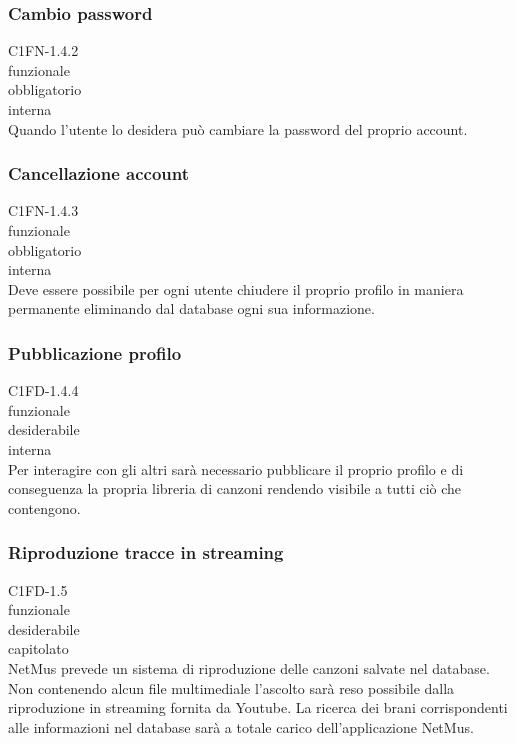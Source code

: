 \subsubsection*{Cambio password}
 C1FN-1.4.2 \\
 funzionale \\
 obbligatorio \\
 interna \\
Quando l'utente lo desidera pu\`o cambiare la password del proprio account.

\subsubsection*{Cancellazione account}
 C1FN-1.4.3 \\
 funzionale \\
 obbligatorio \\
 interna \\
Deve essere possibile per ogni utente chiudere il proprio profilo in maniera
permanente eliminando dal database ogni sua informazione.

\subsubsection*{Pubblicazione profilo}
 C1FD-1.4.4 \\
 funzionale \\
 desiderabile \\
 interna \\
Per interagire con gli altri sar\`a necessario pubblicare il proprio profilo e
di conseguenza la propria libreria di canzoni rendendo visibile a tutti ci\`o che
contengono.

\subsubsection*{Riproduzione tracce in streaming}
 C1FD-1.5 \\
 funzionale \\
 desiderabile \\
 capitolato \\
NetMus prevede un sistema di riproduzione delle canzoni salvate nel database.
Non contenendo alcun file multimediale l'ascolto sar\`a reso possibile dalla
riproduzione in streaming fornita da Youtube. La ricerca dei brani
corrispondenti alle informazioni nel database sar\`a a totale carico
dell'applicazione NetMus.

